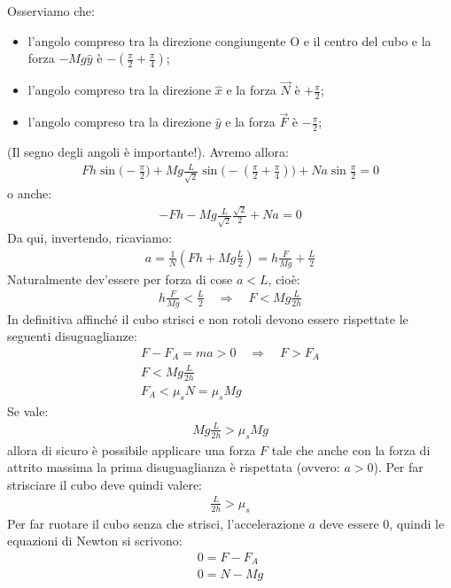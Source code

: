 \documentclass[12pt,a4paper]{book}
\begin{document}
Osserviamo che: 
\begin{itemize}
\item l'angolo compreso tra la direzione congiungente O e il centro del cubo e la forza $-Mg\hat{y}$ è $-(\frac{\pi}{2}+\frac{\pi}{4})$;
\item l'angolo compreso tra la direzione $\hat{x}$ e la forza $\vec{N}$ è $+\frac{\pi}{2}$;
\item l'angolo compreso tra la direzione $\hat{y}$ e la forza $\vec{F}$ è $-\frac{\pi}{2}$;
\end{itemize} 
(Il segno degli angoli è importante!). Avremo allora:
\begin{gather*}
F h \sin \big( -\frac{\pi}{2} \big) + Mg \frac{L}{\sqrt{2}} \sin\big(-(\frac{\pi}{2}+\frac{\pi}{4})\big) + N a \sin \frac{\pi}{2} =0
\end{gather*}
o anche:
\begin{gather*}
-F h - Mg \frac{L}{\sqrt{2}} \frac{\sqrt{2}}{2} + N a =0
\end{gather*}
Da qui, invertendo, ricaviamo:
\begin{gather*}
a= \frac{1}{N}(Fh+Mg\frac{L}{2})=h\frac{F}{Mg}+\frac{L}{2}
\end{gather*}
Naturalmente dev'essere per forza di cose $a<L$, cioè:
\begin{gather*}
h\frac{F}{Mg}<\frac{L}{2}  \quad \Rightarrow \quad F<Mg \frac{L}{2h}
\end{gather*}
In definitiva affinché il cubo strisci e non rotoli devono essere rispettate le seguenti disuguaglianze:
\begin{gather*}
F-F_A=ma>0 \quad \Rightarrow \quad  F>F_A  \\
F<Mg \frac{L}{2h} \\
F_A<\mu_s N=\mu_s Mg
\end{gather*}
Se vale:
\begin{gather*}
Mg \frac{L}{2h}>\mu_s Mg  
\end{gather*}
allora di sicuro è possibile applicare una forza $F$ tale che anche con la forza di attrito massima la prima disuguaglianza è rispettata (ovvero: $a>0$). 
Per far strisciare il cubo deve quindi valere: 
\begin{gather*}
\frac{L}{2h}>\mu_s 
\end{gather*}
Per far ruotare il cubo senza che strisci, l'accelerazione $a$ deve essere $0$, quindi le equazioni di Newton si scrivono:
\begin{gather*}
0=F-F_A \\
0=N-Mg\\
\end{gather*}
\end{document}
